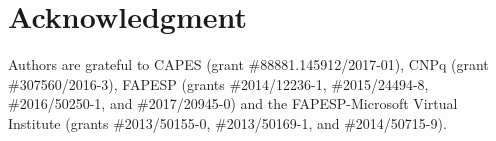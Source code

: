 \section*{Acknowledgment}
Authors are grateful to CAPES (grant \#88881.145912/2017-01), CNPq (grant \#307560/2016-3), FAPESP (grants \#2014/12236-1, \#2015/24494-8, \#2016/50250-1, and \#2017/20945-0) and the FAPESP-Microsoft Virtual Institute (grants \#2013/50155-0, \#2013/50169-1, and \#2014/50715-9).
